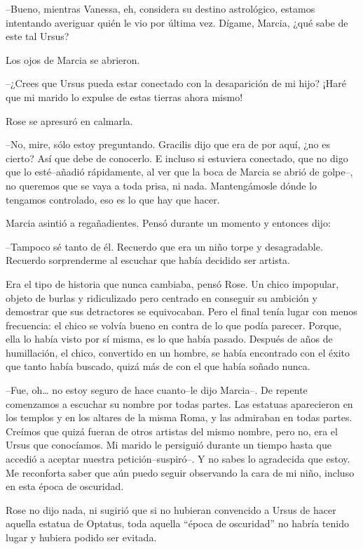 --Bueno, mientras Vanessa, eh, considera su destino astrológico, estamos
intentando averiguar quién le vio por última vez. Dígame, Marcia, ¿qué
sabe de este tal Ursus?

Los ojos de Marcia se abrieron.

--¿Crees que Ursus pueda estar conectado con la desaparición de mi hijo?
¡Haré que mi marido lo expulse de estas tierras ahora mismo!

Rose se apresuró en calmarla.

--No, mire, sólo estoy preguntando. Gracilis dijo que era de por aquí,
¿no es cierto? Así que debe de conocerlo. E incluso si estuviera
conectado, que no digo que lo esté--añadió rápidamente, al ver que la
boca de Marcia se abrió de golpe--, no queremos que se vaya a toda
prisa, ni nada. Mantengámosle dónde lo tengamos controlado, eso es lo
que hay que hacer.

Marcia asintió a regañadientes. Pensó durante un momento y entonces
dijo:

--Tampoco sé tanto de él. Recuerdo que era un niño torpe y desagradable.
Recuerdo sorprenderme al escuchar que había decidido ser artista.

Era el tipo de historia que nunca cambiaba, pensó Rose. Un chico
impopular, objeto de burlas y ridiculizado pero centrado en conseguir su
ambición y demostrar que sus detractores se equivocaban. Pero el final
tenía lugar con menos frecuencia: el chico se volvía bueno en contra de
lo que podía parecer. Porque, ella lo había visto por sí misma, es lo
que había pasado. Después de años de humillación, el chico, convertido
en un hombre, se había encontrado con el éxito que tanto había buscado,
quizá más de con el que había soñado nunca.

--Fue, oh\ldots{} no estoy seguro de hace cuanto--le dijo Marcia--. De
repente comenzamos a escuchar su nombre por todas partes. Las estatuas
aparecieron en los templos y en los altares de la misma Roma, y las
admiraban en todas partes. Creímos que quizá fueran de otros artistas
del mismo nombre, pero no, era el Ursus que conocíamos. Mi marido le
persiguió durante un tiempo hasta que accedió a aceptar nuestra
petición--suspiró--. Y no sabes lo agradecida que estoy. Me reconforta
saber que aún puedo seguir observando la cara de mi niño, incluso en
esta época de oscuridad.

Rose no dijo nada, ni sugirió que si no hubieran convencido a Ursus de
hacer aquella estatua de Optatus, toda aquella ``época de oscuridad'' no
habría tenido lugar y hubiera podido ser evitada.

